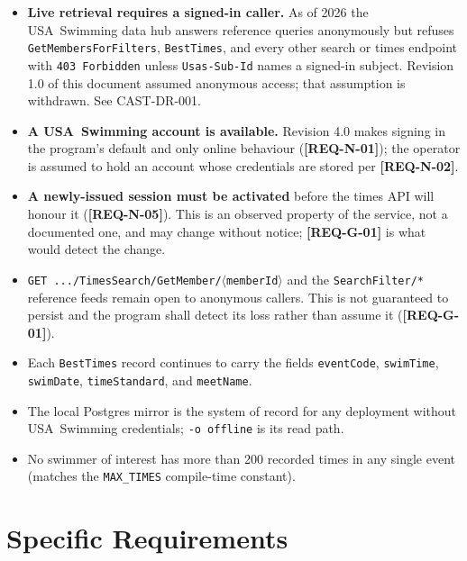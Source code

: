 \documentclass[12pt]{article}
\newcommand{\code}[1]{\texttt{#1}}
\newcommand{\req}[1]{\textbf{[#1]}}
\begin{document}
\begin{itemize}
  \item \textbf{Live retrieval requires a signed-in caller.}  As of
        2026 the USA~Swimming data hub answers reference queries
        anonymously but refuses \code{GetMembersForFilters},
        \code{BestTimes}, and every other search or times endpoint with
        \code{403 Forbidden} unless \code{Usas-Sub-Id} names a
        signed-in subject.  Revision 1.0 of this document assumed
        anonymous access; that assumption is withdrawn.  See
        CAST-DR-001.
  \item \textbf{A USA~Swimming account is available.}  Revision 4.0
        makes signing in the program's default and only online
        behaviour (\req{REQ-N-01}); the operator is assumed to hold an
        account whose credentials are stored per \req{REQ-N-02}.
  \item \textbf{A newly-issued session must be activated} before the
        times API will honour it (\req{REQ-N-05}).  This is an observed
        property of the service, not a documented one, and may change
        without notice; \req{REQ-G-01} is what would detect the
        change.
  \item \code{GET .../TimesSearch/GetMember/$\langle$memberId$\rangle$}
        and the \code{SearchFilter/*} reference feeds remain open to
        anonymous callers.  This is not guaranteed to persist and the
        program shall detect its loss rather than assume it
        (\req{REQ-G-01}).
  \item Each \code{BestTimes} record continues to carry the fields
        \code{eventCode}, \code{swimTime}, \code{swimDate},
        \code{timeStandard}, and \code{meetName}.
  \item The local Postgres mirror is the system of record for any
        deployment without USA~Swimming credentials; \code{-o offline}
        is its read path.
  \item No swimmer of interest has more than 200 recorded times in
        any single event (matches the \code{MAX\_TIMES} compile-time
        constant).
\end{itemize}

\section{Specific Requirements}
\end{document}
